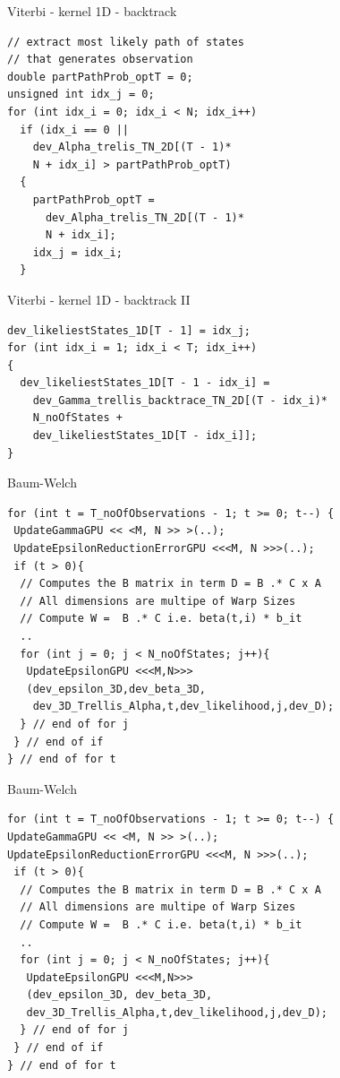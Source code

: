 \documentclass[11pt]{beamer}
\begin{document}
\begin{frame}[fragile]{Viterbi - kernel 1D - backtrack}
\begin{verbatim}
// extract most likely path of states 
// that generates observation
double partPathProb_optT = 0;
unsigned int idx_j = 0;
for (int idx_i = 0; idx_i < N; idx_i++) 
  if (idx_i == 0 || 
    dev_Alpha_trelis_TN_2D[(T - 1)*
    N + idx_i] > partPathProb_optT)
  {
    partPathProb_optT = 
      dev_Alpha_trelis_TN_2D[(T - 1)*
      N + idx_i];
    idx_j = idx_i;
  }

\end{verbatim}
\end{frame}

\begin{frame}[fragile]{Viterbi - kernel 1D - backtrack II}
\begin{verbatim}
dev_likeliestStates_1D[T - 1] = idx_j;
for (int idx_i = 1; idx_i < T; idx_i++)
{
  dev_likeliestStates_1D[T - 1 - idx_i] =
    dev_Gamma_trellis_backtrace_TN_2D[(T - idx_i)*
    N_noOfStates +
    dev_likeliestStates_1D[T - idx_i]];
}
\end{verbatim}
\end{frame}

\begin{frame}[fragile]{Baum-Welch}
\begin{verbatim}
for (int t = T_noOfObservations - 1; t >= 0; t--) {
 UpdateGammaGPU << <M, N >> >(..);
 UpdateEpsilonReductionErrorGPU <<<M, N >>>(..);
 if (t > 0){
  // Computes the B matrix in term D = B .* C x A
  // All dimensions are multipe of Warp Sizes
  // Compute W =  B .* C i.e. beta(t,i) * b_it
  ..
  for (int j = 0; j < N_noOfStates; j++){
   UpdateEpsilonGPU <<<M,N>>>
   (dev_epsilon_3D,dev_beta_3D,
    dev_3D_Trellis_Alpha,t,dev_likelihood,j,dev_D);
  } // end of for j
 } // end of if
} // end of for t
\end{verbatim}
\end{frame}

\begin{frame}[fragile]{Baum-Welch}
\begin{verbatim}
for (int t = T_noOfObservations - 1; t >= 0; t--) {
UpdateGammaGPU << <M, N >> >(..);
UpdateEpsilonReductionErrorGPU <<<M, N >>>(..);
 if (t > 0){
  // Computes the B matrix in term D = B .* C x A
  // All dimensions are multipe of Warp Sizes
  // Compute W =  B .* C i.e. beta(t,i) * b_it
  ..
  for (int j = 0; j < N_noOfStates; j++){
   UpdateEpsilonGPU <<<M,N>>>
   (dev_epsilon_3D, dev_beta_3D,
   dev_3D_Trellis_Alpha,t,dev_likelihood,j,dev_D);
  } // end of for j
 } // end of if
} // end of for t
\end{verbatim}
\end{frame}
\end{document}

